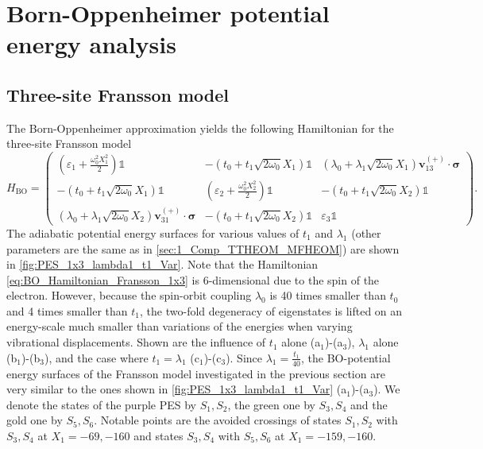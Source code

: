 \documentclass{article}
\renewcommand{\vec}[1]{\mathbf{#1}}
\begin{document}
\clearpage
\section{Born-Oppenheimer potential energy analysis }

\subsection{Three-site Fransson model}
The Born-Oppenheimer approximation yields the following Hamiltonian for the three-site Fransson model
\begin{equation}
	H_\mathrm{BO} = \begin{pmatrix}
		\left(\varepsilon_1 + \frac{\omega_0^2 X_1^2}{2}\right) \mathds{1} & -(t_0 +t_1\sqrt{2\omega_0}X_1)\mathds{1} & (\lambda_0 + \lambda_1\sqrt{2\omega_0}X_1)\vec{v}_{13}^{(+)}\cdot\bm{\sigma}\\
		-(t_0 +t_1\sqrt{2\omega_0}X_1)\mathds{1} & \left(\varepsilon_2 + \frac{\omega_0^2 X_2^2}{2}\right) \mathds{1} & -(t_0 +t_1\sqrt{2\omega_0}X_2)\mathds{1} \\
		(\lambda_0 + \lambda_1\sqrt{2\omega_0}X_2)\vec{v}_{31}^{(+)}\cdot\bm{\sigma}&  -(t_0 +t_1\sqrt{2\omega_0}X_2)\mathds{1} & \varepsilon_3 \mathds{1}
	\end{pmatrix}.\label{eq:BO_Hamiltonian_Fransson_1x3}
\end{equation}
The adiabatic potential energy surfaces for various values of $t_1$ and $\lambda_1$ (other parameters are the same as in \cref{sec:1_Comp_TTHEOM_MFHEOM}) are shown in \cref{fig:PES_1x3_lambda1_t1_Var}. Note that the Hamiltonian \cref{eq:BO_Hamiltonian_Fransson_1x3} is 6-dimensional due to the spin of the electron. However, because the spin-orbit coupling $\lambda_0$ is 40 times smaller than $t_0$ and 4 times smaller than $t_1$, the two-fold degeneracy of eigenstates is lifted on an energy-scale much smaller than variations of the energies when varying vibrational displacements. Shown are the influence of $t_1$ alone (a$_1$)-(a$_3$), $\lambda_1$ alone (b$_1$)-(b$_3$), and the case where $t_1=\lambda_1$ (c$_1$)-(c$_3$). Since $\lambda_1=\frac{t_1}{40}$, the BO-potential energy surfaces of the Fransson model investigated in the previous section are very similar to the ones shown in \cref{fig:PES_1x3_lambda1_t1_Var} (a$_1$)-(a$_3$). We denote the states of the purple PES by $S_1,S_2$, the green one by $S_3,S_4$ and the gold one by $S_5,S_6$.
Notable points are the avoided crossings of states $S_1,S_2$ with $S_3,S_4$ at $X_1=-69,-160$ and states $S_3,S_4$ with $S_5,S_6$ at $X_1=-159,-160$. 
\end{document}
